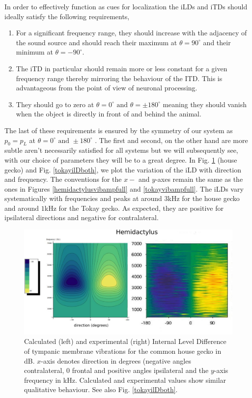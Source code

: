 In order to effectively function as cues for localization the iLDs and iTDs should ideally satisfy the following requirements,
\begin{enumerate}\label{listild}
 \item For a significant frequency range, they should increase with the adjacency of the sound source and should reach their maximum at $\theta=90^\circ$ and
 their minimum at $\theta=-90^\circ$.
 \item The iTD in particular should remain more or less constant for a given frequency range thereby mirroring the behaviour
 of the ITD. This is advantageous from the point of view of neuronal processing.
  \item They should go to zero at $\theta=0^\circ \mbox{ and } \theta=\pm 180^\circ$ meaning they should vanish when the object is directly
 in front of and behind the animal.
\end{enumerate}
The last of these requirements is ensured by the symmetry of our system as $p_0=p_L$ at $\theta=0^\circ \mbox{ and } \pm 180^\circ$ .
The first and second, on the other hand are more subtle aren't necessarily satisfied for all systems but we will subsequently see, with our choice of
parameters they will be to a great degree. In Fig. \ref{hemidactylusilDboth} (house gecko) and Fig. \ref{tokayilDboth}, we plot the
variation of the iLD with direction and frequency. The conventions for the $x-$ and $y$-axes remain the same as the ones in Figures \ref{hemidactylusvibampfull}
and \ref{tokayvibampfull}. The iLDs vary systematically with frequencies and peaks at around $3$kHz for the house gecko and around $1$kHz for the Tokay gecko.
As expected, they are positive for ipsilateral directions and negative for contralateral.
\begin{figure}[ht!]
 \centering
 \includegraphics[width=1.0\linewidth]{Diagrams/Plots/iLD/hemidactylusiLDboth.png}
 \caption[ILD plots for the common house gecko]{Calculated (left) and experimental (right) Internal Level Difference of tympanic membrane vibrations for the common house gecko
 in dB. $x$-axis denotes direction in degrees (negative angles contralateral, 0 frontal and positive angles ipsilateral and the $y$-axis frequency in kHz. 
 Calculated and experimental values \cite{dalsgaardmanley2} show similar qualitative behaviour. See also Fig. \ref{tokayilDboth}.}
  \label{hemidactylusilDboth}
\end{figure}

